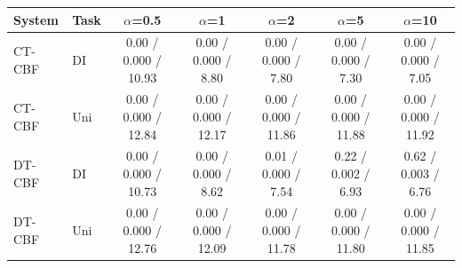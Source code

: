 \begin{tabular}{llccccc}
\hline
System & Task & $\alpha$=0.5 & $\alpha$=1 & $\alpha$=2 & $\alpha$=5 & $\alpha$=10 \\
\hline
CT-CBF & DI & 0.00 / 0.000 / 10.93 & 0.00 / 0.000 / 8.80 & 0.00 / 0.000 / 7.80 & 0.00 / 0.000 / 7.30 & 0.00 / 0.000 / 7.05 \\
CT-CBF & Uni & 0.00 / 0.000 / 12.84 & 0.00 / 0.000 / 12.17 & 0.00 / 0.000 / 11.86 & 0.00 / 0.000 / 11.88 & 0.00 / 0.000 / 11.92 \\
DT-CBF & DI & 0.00 / 0.000 / 10.73 & 0.00 / 0.000 / 8.62 & 0.01 / 0.000 / 7.54 & 0.22 / 0.002 / 6.93 & 0.62 / 0.003 / 6.76 \\
DT-CBF & Uni & 0.00 / 0.000 / 12.76 & 0.00 / 0.000 / 12.09 & 0.00 / 0.000 / 11.78 & 0.00 / 0.000 / 11.80 & 0.00 / 0.000 / 11.85 \\
\hline
\end{tabular}
